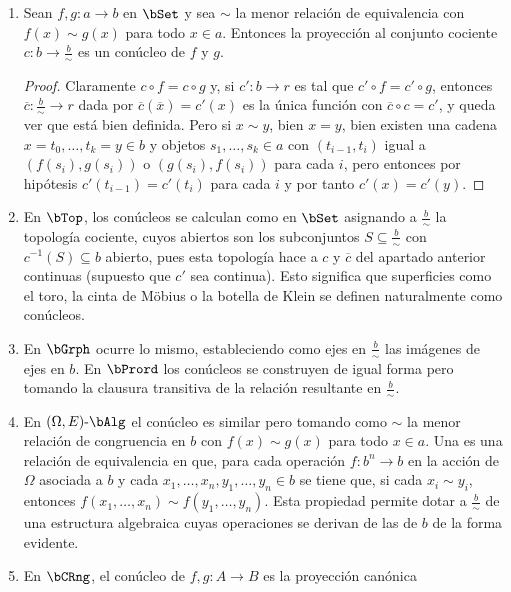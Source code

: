 \begin{example}\;
  \begin{enumerate}
  \item Sean $f,g:a\to b$ en $\bSet$ y sea $\sim$ la menor relación de
    equivalencia con $f(x)\sim g(x)$ para todo $x\in a$. Entonces la proyección
    al conjunto cociente $c:b\to\frac{b}{\sim}$ es un conúcleo de $f$ y $g$.
    \begin{proof}
      Claramente $c\circ f=c\circ g$ y, si $c':b\to r$ es tal que
      $c'\circ f=c'\circ g$, entonces $\overline c:\frac{b}{\sim}\to r$ dada por
      $\overline c(\overline x)=c'(x)$ es la única función con
      $\overline c\circ c=c'$, y queda ver que está bien definida. Pero si
      $x\sim{}y$, bien $x=y$, bien existen una cadena $x=t_0,\dots,t_k=y\in b$ y
      objetos $s_1,\dots,s_k\in a$ con $(t_{i-1},t_i)$ igual a $(f(s_i),g(s_i))$
      o $(g(s_i),f(s_i))$ para cada $i$, pero entonces por hipótesis
      $c'(t_{i-1})=c'(t_i)$ para cada $i$ y por tanto $c'(x)=c'(y)$.
    \end{proof}
  \item En $\bTop$, los conúcleos se calculan como en $\bSet$ asignando a
    $\frac{b}{\sim}$ la topología cociente, cuyos abiertos son los subconjuntos
    $S\subseteq\frac{b}{\sim}$ con $c^{-1}(S)\subseteq b$ abierto, pues esta
    topología hace a $c$ y $\overline c$ del apartado anterior continuas
    (supuesto que $c'$ sea continua). Esto significa que superficies como el
    toro, la cinta de Möbius o la botella de Klein se definen naturalmente como
    conúcleos.
  \item En $\bGrph$ ocurre lo mismo, estableciendo como ejes en
    $\frac{b}{\sim}$ las imágenes de ejes en $b$. En $\bPrord$ los conúcleos se
    construyen de igual forma pero tomando la clausura transitiva de la relación
    resultante en $\frac{b}{\sim}$.
  \item En $(\Omega,E)\dash\bAlg$ el conúcleo es similar pero tomando como
    $\sim$ la menor relación de congruencia en $b$ con $f(x)\sim g(x)$ para todo
    $x\in a$. Una  es una relación de equivalencia
    en que, para cada operación $f:b^n\to b$ en la acción de $\Omega$ asociada a
    $b$ y cada $x_1,\dots,x_n,y_1,\dots,y_n\in b$ se tiene que, si cada
    $x_i\sim y_i$, entonces $f(x_1,\dots,x_n)\sim f(y_1,\dots,y_n)$. Esta
    propiedad permite dotar a $\frac{b}{\sim}$ de una estructura algebraica cuyas
    operaciones se derivan de las de $b$ de la forma evidente.
  \item En $\bCRng$, el conúcleo de $f,g:A\to B$ es la proyección canónica

\end{enumerate}
\end{example}
